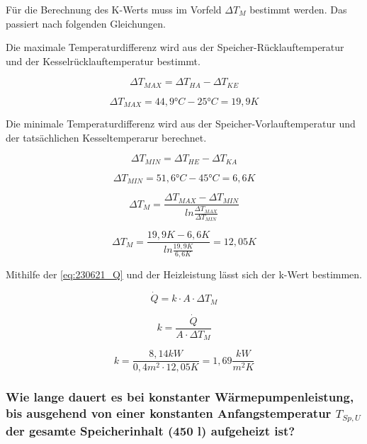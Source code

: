 Für die Berechnung des K-Werts muss im Vorfeld $\Delta T_M$ bestimmt werden. Das passiert nach folgenden Gleichungen.

Die maximale Temperaturdifferenz wird aus der Speicher-Rücklauftemperatur und der Kesselrücklauftemperatur bestimmt.

\begin{equation}
    \Delta T_{MAX}= \Delta T_{HA}-\Delta T_{KE}
    \label{eq:230621_DeltaTMAX}
\end{equation}



$$\Delta T_{MAX}= 44,9\text{°}C-25 \text{°} C= 19,9K$$

Die minimale Temperaturdifferenz wird aus der Speicher-Vorlauftemperatur und der tatsächlichen Kesseltemperarur berechnet.

\begin{equation}
    \Delta T_{MIN}= \Delta T_{HE}-\Delta T_{KA}
    \label{eq:230621_DeltaTMIN}
\end{equation}

$$\Delta T_{MIN}= 51,6 \text{°} C-45 \text{°} C= 6,6K$$

\begin{equation}
    \Delta T_{M}= \frac{\Delta T_{MAX}-\Delta T_{MIN}}{ln\frac{\Delta T_{MAX}}{\Delta T_{MIN}}}
    \label{eq:230621_DeltaTM}
\end{equation}

$$\Delta T_M= \frac{19,9K-6,6K}{ln\frac{19,9K}{6,6K}}= 12,05K$$

Mithilfe der \autoref{eq:230621_Q} und der Heizleistung lässt sich der k-Wert bestimmen.

\begin{equation}
    \dot{Q}=k\cdot A \cdot \Delta T_M
    \label{eq:230621_Q}
\end{equation}

\begin{equation}
    k = \frac{\dot{Q}}{ A \cdot \Delta T_M} 
    \label{eq:230621_k}
\end{equation}

$$k=\frac{8,14 kW}{ 0,4m^2 \cdot 12,05K}=1,69 \frac{kW}{m^2K}$$

\subsubsection{Wie lange dauert es bei konstanter Wärmepumpenleistung, bis ausgehend von einer
konstanten Anfangstemperatur \texorpdfstring{$T_{Sp,U}$}{} der gesamte Speicherinhalt (450 l) aufgeheizt ist?}

